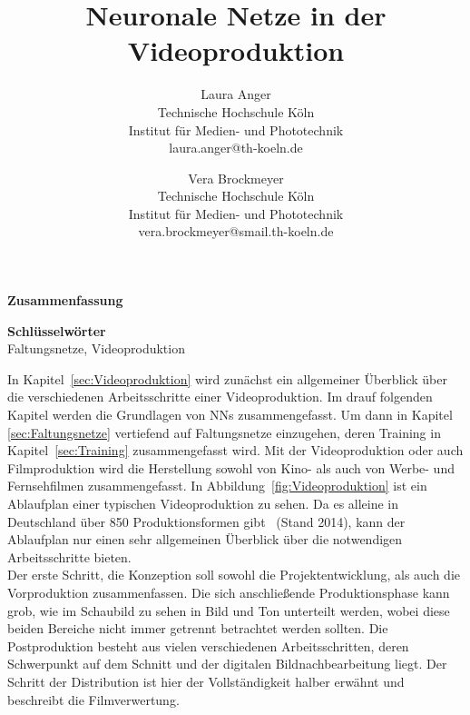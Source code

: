 \documentclass[times, 12pt,twocolumn]{article}
\begin{document}
\title{Neuronale Netze in der Videoproduktion}

\author{Laura Anger\\
Technische Hochschule K\"oln \\ Institut f\"ur Medien- und Phototechnik \\  laura.anger@th-koeln.de \\
\and
Vera Brockmeyer\\
Technische Hochschule K\"oln \\ Institut f\"ur Medien- und Phototechnik \\ vera.brockmeyer@smail.th-koeln.de \\
}

\maketitle
\thispagestyle{empty}


\large{\textbf{Zusammenfassung}}\\ \small %
{} 

\large{\textbf{Schl\"usselw\"orter}}\\ \small %
 Faltungsnetze, Videoproduktion


 \label{sec:Einleitung}

 \label{sec:Grundlagen}
In Kapitel~\ref{sec:Videoproduktion} wird zunächst ein allgemeiner Überblick über die verschiedenen Arbeitsschritte einer Videoproduktion. Im drauf folgenden Kapitel werden die Grundlagen von NNs zusammengefasst. Um dann in Kapitel \ref{sec:Faltungsnetze} vertiefend auf Faltungsnetze einzugehen, deren Training in Kapitel~\ref{sec:Training} zusammengefasst wird. 
 \label{sec:Videoproduktion}
Mit der Videoproduktion oder auch Filmproduktion wird die Herstellung sowohl von Kino- als auch von Werbe- und Fernsehfilmen zusammengefasst. In Abbildung~\ref{fig:Videoproduktion} ist ein Ablaufplan einer typischen Videoproduktion zu sehen. Da es alleine in Deutschland über 850 Produktionsformen gibt~\cite{formatt} (Stand 2014), kann der Ablaufplan nur einen sehr allgemeinen Überblick über die notwendigen Arbeitsschritte bieten. \\
Der erste Schritt, die Konzeption soll sowohl die Projektentwicklung, als auch die Vorproduktion zusammenfassen. Die sich anschließende Produktionsphase kann grob, wie im Schaubild zu sehen in Bild und Ton unterteilt werden, wobei diese beiden Bereiche nicht immer getrennt betrachtet werden sollten. Die Postproduktion besteht aus vielen verschiedenen Arbeitsschritten, deren Schwerpunkt auf dem Schnitt und der digitalen Bildnachbearbeitung liegt. Der Schritt der Distribution ist hier der Vollständigkeit halber erwähnt und beschreibt die Filmverwertung. \\
\end{document}
